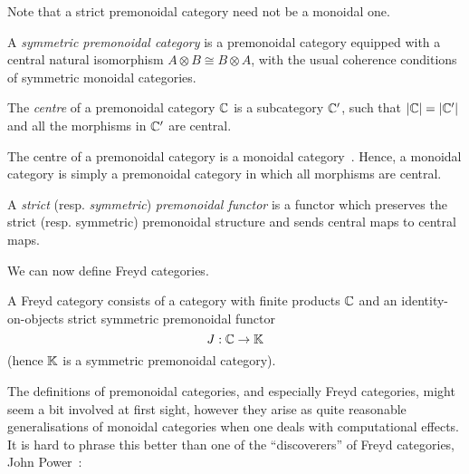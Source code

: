 Note that a strict premonoidal category need not be a monoidal one.

A \emph{symmetric premonoidal category} is a premonoidal category equipped with
a central natural isomorphism $A\otimes B \cong B\otimes A$, with the usual
coherence conditions of symmetric monoidal categories.

The \emph{centre} of a premonoidal category $\mathbb{C}$ is a subcategory $\mathbb{C}'$,
such that $|\mathbb{C}| = |\mathbb{C}'|$ and all the morphisms in $\mathbb{C}'$ are central.

The centre of a premonoidal category is a monoidal
category~\cite[Prop.~3.1]{pow-rob}.
Hence, a monoidal category is simply a premonoidal category in which all
morphisms are central.

A \emph{strict} (resp. \emph{symmetric}) \emph{premonoidal functor} is a functor which
preserves the strict (resp. symmetric) premonoidal structure and sends central
maps to central maps.

We can now define Freyd categories.

\begin{definition}
    A Freyd category consists of a category with finite products $\mathbb{C}$
    and an identity-on-objects strict symmetric premonoidal functor
    \[ J: \mathbb{C} \to \mathbb{K} \]
    (hence $\mathbb{K}$ is a symmetric premonoidal category).
\end{definition}

The definitions of premonoidal categories, and especially Freyd categories,
might seem a bit involved at first sight, however they arise as quite
reasonable generalisations of monoidal categories when one deals with
computational effects. It is hard to phrase this better than one of the
``discoverers'' of Freyd categories, John Power~\cite{gen-comp-eff-models}:

